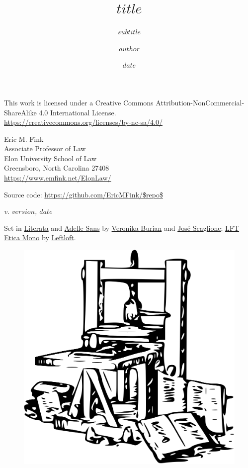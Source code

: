 \documentclass[letterpaper,twoside,openright]{tufte-book}
\title{$title$}
\subtitle{$subtitle$}
\author{$author$}
\date{$date$}
\begin{document}

\frontmatter
\maketitle

\clearpage

\pagestyle{empty}
\begingroup
\parindent 0pt
\vspace*{\fill}

\href{https://creativecommons.org/licenses/by-nc-sa/4.0/}{\ccbyncsa} 

\begin{small}
\raggedright{This work is licensed under a Creative Commons Attribution-NonCommercial-ShareAlike 4.0 International License.} \\
\url{https://creativecommons.org/licenses/by-nc-sa/4.0/}
\end{small}

\vspace{1em}

\begin{small}
Eric M. Fink\\
Associate Professor of Law \\
Elon University School of Law \\
Greensboro, North Carolina 27408 \\
\url{https://www.emfink.net/ElonLaw/}

\vspace{1em}

Source code: \url{https://github.com/EricMFink/$repo$}

\itshape{v. $version$, $date$}

\vspace{2em}

Set in \href{https://www.type-together.com/literata-font/}{Literata} and \href{https://www.type-together.com/adelle-sans-font/}{Adelle Sans} by \href{https://www.type-together.com/veronika-burian/}{Veronika Burian} and \href{https://www.type-together.com/jose-scaglione/}{José Scaglione}; \href{https://www.type-together.com/lft-etica-mono-font/}{LFT Etica Mono} by \href{https://www.type-together.com/leftloft/}{Leftloft}.

\begin{figure}[h!]
  \includegraphics[width=0.3\linewidth]{img/gutenberg_press.png}
\end{figure}

\end{small}
\end{document}
